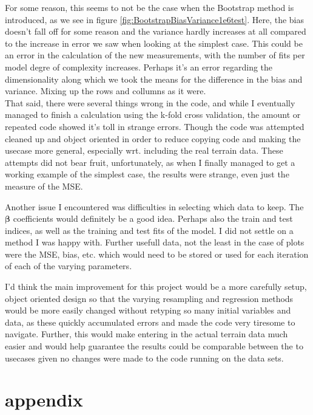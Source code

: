 \documentclass[12pt]{revtex4-2}
\begin{document}
For some reason, this seems to not be the case when the Bootstrap method is introduced, 
as we see in figure \ref{fig:BootstrapBiasVariance1e6test}.  Here, the bias doesn't fall off 
for some reason and the variance hardly increases at all compared to the increase in 
error we saw when looking at the simplest case. This could be an error in the calculation
of the new measurements, with the number of fits per model degre of complexity increases. 
Perhaps it's an error regarding the dimensionality along which we took the means for the
difference in the bias and variance. Mixing up the rows and collumns as it were. \\

That said, there were several things wrong in the code, and while I eventually managed to 
finish a calculation using the k-fold cross validation, the amount or repeated code showed
it's toll in strange errors. Though the code was attempted cleaned up and object oriented 
in order to reduce copying code and making the usecase more general, especially wrt.
including the real terrain data. These attempts did not bear fruit, unfortunately, as when
I finally managed to get a working example of the simplest case, the results were strange, 
even just the measure of the MSE. 

Another issue I encountered was difficulties in selecting which data to keep. The 
$\bm{\beta}$ coefficients would definitely be a good idea. Perhaps also the train and
test indices, as well as the training and test fits of the model. I did not settle on a 
method I was happy with. Further usefull data, not the least in the case of plots were the
MSE, bias, etc. which would need to be stored or used for each iteration of each of the 
varying parameters. 

I'd think the main improvement for this project would be a more carefully setup, object
oriented design so that the varying resampling and regression methods would be more 
easily changed without retyping so many initial variables and data, as these quickly 
accumulated errors and made the code very tiresome to navigate. Further, this would 
make entering in the actual terrain data much easier and would help guarantee the results
could be comparable between the to usecases given no changes were made to the code running
on the data sets.

\section{appendix}
\end{document}

